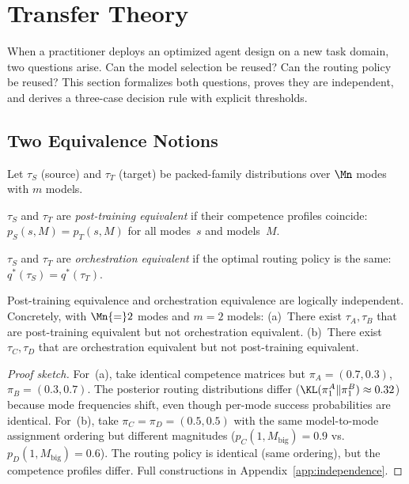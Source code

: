 
\section{Transfer Theory}
\label{sec:transfer}

When a practitioner deploys an optimized agent design on a new task
domain, two questions arise.  Can the model selection be reused?  Can the
routing policy be reused?  This section formalizes both questions, proves
they are independent, and derives a three-case decision rule with explicit
thresholds.

\subsection{Two Equivalence Notions}
\label{sec:equivalences}

Let $\tau_S$ (source) and $\tau_T$ (target) be packed-family distributions
over $\Mn$ modes with $m$ models.

\begin{definition}
\label{def:pt-equiv}
$\tau_S$ and $\tau_T$ are \emph{post-training equivalent} if their
competence profiles coincide:
$p_S(s,M) = p_T(s,M)$ for all modes~$s$ and models~$M$.
\end{definition}

\begin{definition}
\label{def:orch-equiv}
$\tau_S$ and $\tau_T$ are \emph{orchestration equivalent} if the optimal
routing policy is the same: $q^*(\tau_S) = q^*(\tau_T)$.
\end{definition}

\begin{proposition}[Independence]
\label{prop:independence}
Post-training equivalence and orchestration equivalence are logically
independent.  Concretely, with $\Mn{=}2$ modes and $m{=}2$ models:
(a)~There exist $\tau_A, \tau_B$ that are post-training equivalent but
  not orchestration equivalent.
(b)~There exist $\tau_C, \tau_D$ that are orchestration equivalent but
  not post-training equivalent.
\end{proposition}

\begin{proof}[Proof sketch]
For~(a), take identical competence matrices but
$\pi_A = (0.7, 0.3)$, $\pi_B = (0.3, 0.7)$.
The posterior routing distributions differ
($\KL(\pi_1^A \| \pi_1^B) \approx 0.32$) because mode frequencies
shift, even though per-mode success probabilities are identical.
For~(b), take $\pi_C = \pi_D = (0.5, 0.5)$ with the same model-to-mode
assignment ordering but different magnitudes
($p_C(1,M_{\mathrm{big}}) = 0.9$ vs.\
$p_D(1,M_{\mathrm{big}}) = 0.6$).
The routing policy is identical (same ordering), but the competence
profiles differ.
Full constructions in Appendix~\ref{app:independence}.
\end{proof}

